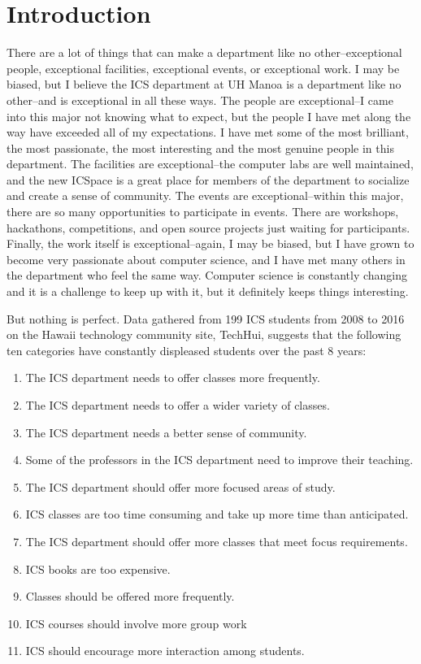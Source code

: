\chapter{Introduction}
There are a lot of things that can make a department like no other--exceptional people, exceptional facilities, exceptional events, or exceptional work. I may be biased, but I believe the ICS department at UH Manoa is a department like no other--and is exceptional in all these ways. The people are exceptional--I came into this major not knowing what to expect, but the people I have met along the way have exceeded all of my expectations. I have met some of the most brilliant, the most passionate, the most interesting and the most genuine people in this department. The facilities are exceptional--the computer labs are well maintained, and the new ICSpace is a great place for members of the department to socialize and create a sense of community. The events are exceptional--within this major, there are so many opportunities to participate in events. There are workshops, hackathons, competitions, and open source projects just waiting for participants. Finally, the work itself is exceptional--again, I may be biased, but I have grown to become very passionate about computer science, and I have met many others in the department who feel the same way. Computer science is constantly changing and it is a challenge to keep up with it, but it definitely keeps things interesting.

But nothing is perfect. Data gathered from 199 ICS students from 2008 to 2016 on the Hawaii technology community site, TechHui, suggests that the following ten categories have constantly displeased students over the past 8 years:

\begin{enumerate}
  \item The ICS department needs to offer classes more frequently.
  \item The ICS department needs to offer a wider variety of classes.
  \item The ICS department needs a better sense of community.
  \item Some of the professors in the ICS department need to improve their teaching.
  \item The ICS department should offer more focused areas of study.
  \item ICS classes are too time consuming and take up more time than anticipated.
  \item The ICS department should offer more classes that meet focus requirements.
  \item ICS books are too expensive.
  \item Classes should be offered more frequently.
  \item ICS courses should involve more group work 
  \item ICS should encourage more interaction among students.
\end{enumerate}

